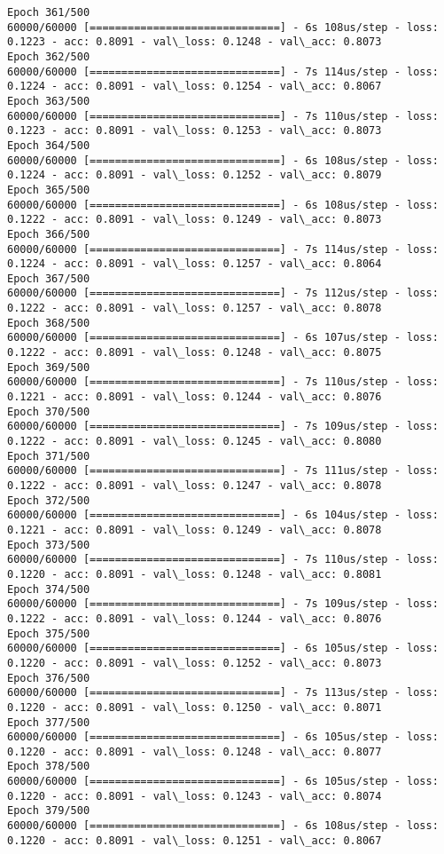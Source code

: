 \documentclass[11pt]{article}
\begin{document}
\begin{Verbatim}[commandchars=\\\{\}]
Epoch 361/500
60000/60000 [==============================] - 6s 108us/step - loss: 0.1223 - acc: 0.8091 - val\_loss: 0.1248 - val\_acc: 0.8073
Epoch 362/500
60000/60000 [==============================] - 7s 114us/step - loss: 0.1224 - acc: 0.8091 - val\_loss: 0.1254 - val\_acc: 0.8067
Epoch 363/500
60000/60000 [==============================] - 7s 110us/step - loss: 0.1223 - acc: 0.8091 - val\_loss: 0.1253 - val\_acc: 0.8073
Epoch 364/500
60000/60000 [==============================] - 6s 108us/step - loss: 0.1224 - acc: 0.8091 - val\_loss: 0.1252 - val\_acc: 0.8079
Epoch 365/500
60000/60000 [==============================] - 6s 108us/step - loss: 0.1222 - acc: 0.8091 - val\_loss: 0.1249 - val\_acc: 0.8073
Epoch 366/500
60000/60000 [==============================] - 7s 114us/step - loss: 0.1224 - acc: 0.8091 - val\_loss: 0.1257 - val\_acc: 0.8064
Epoch 367/500
60000/60000 [==============================] - 7s 112us/step - loss: 0.1222 - acc: 0.8091 - val\_loss: 0.1257 - val\_acc: 0.8078
Epoch 368/500
60000/60000 [==============================] - 6s 107us/step - loss: 0.1222 - acc: 0.8091 - val\_loss: 0.1248 - val\_acc: 0.8075
Epoch 369/500
60000/60000 [==============================] - 7s 110us/step - loss: 0.1221 - acc: 0.8091 - val\_loss: 0.1244 - val\_acc: 0.8076
Epoch 370/500
60000/60000 [==============================] - 7s 109us/step - loss: 0.1222 - acc: 0.8091 - val\_loss: 0.1245 - val\_acc: 0.8080
Epoch 371/500
60000/60000 [==============================] - 7s 111us/step - loss: 0.1222 - acc: 0.8091 - val\_loss: 0.1247 - val\_acc: 0.8078
Epoch 372/500
60000/60000 [==============================] - 6s 104us/step - loss: 0.1221 - acc: 0.8091 - val\_loss: 0.1249 - val\_acc: 0.8078
Epoch 373/500
60000/60000 [==============================] - 7s 110us/step - loss: 0.1220 - acc: 0.8091 - val\_loss: 0.1248 - val\_acc: 0.8081
Epoch 374/500
60000/60000 [==============================] - 7s 109us/step - loss: 0.1222 - acc: 0.8091 - val\_loss: 0.1244 - val\_acc: 0.8076
Epoch 375/500
60000/60000 [==============================] - 6s 105us/step - loss: 0.1220 - acc: 0.8091 - val\_loss: 0.1252 - val\_acc: 0.8073
Epoch 376/500
60000/60000 [==============================] - 7s 113us/step - loss: 0.1220 - acc: 0.8091 - val\_loss: 0.1250 - val\_acc: 0.8071
Epoch 377/500
60000/60000 [==============================] - 6s 105us/step - loss: 0.1220 - acc: 0.8091 - val\_loss: 0.1248 - val\_acc: 0.8077
Epoch 378/500
60000/60000 [==============================] - 6s 105us/step - loss: 0.1220 - acc: 0.8091 - val\_loss: 0.1243 - val\_acc: 0.8074
Epoch 379/500
60000/60000 [==============================] - 6s 108us/step - loss: 0.1220 - acc: 0.8091 - val\_loss: 0.1251 - val\_acc: 0.8067

\end{Verbatim}
\end{document}
